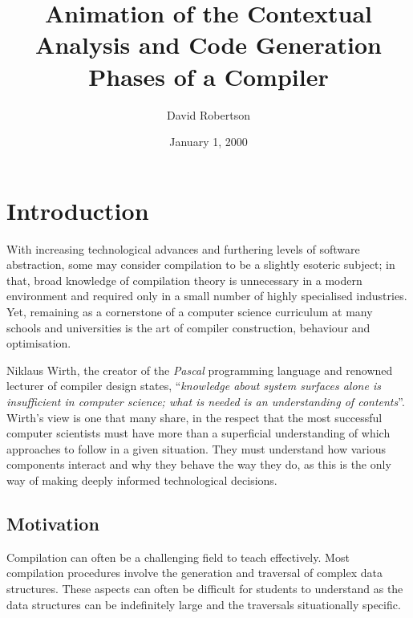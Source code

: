 \documentclass{l4proj}
\begin{document}
\title{Animation of the Contextual Analysis and Code Generation Phases of a Compiler}
\author{David Robertson}
\date{January 1, 2000}
\maketitle

\begin{abstract}

\end{abstract}

\educationalconsent
%
%
\tableofcontents

\chapter{Introduction}
With increasing technological advances and furthering levels of software abstraction, some may consider compilation to be a slightly esoteric subject; in that, broad knowledge of compilation theory is unnecessary in a modern environment and required only in a small number of highly specialised industries. Yet, remaining as a cornerstone of a computer science curriculum at many schools and universities is the art of compiler construction, behaviour and optimisation.

Niklaus Wirth, the creator of the \textit{Pascal} programming language and renowned lecturer of compiler design states, ``\textit{knowledge about system surfaces alone is insufficient in computer science; what is needed is an understanding of contents}''\cite{WirthTheory}. Wirth's view is one that many share, in the respect that the most successful computer scientists must have more than a superficial understanding of which approaches to follow in a given situation. They must understand how various components interact and why they behave the way they do, as this is the only way of making deeply informed technological decisions.

\section{Motivation}
Compilation can often be a challenging field to teach effectively. Most compilation procedures involve the generation and traversal of complex data structures. These aspects can often be difficult for students to understand as the data structures can be indefinitely large and the traversals situationally specific. 
\end{document}
